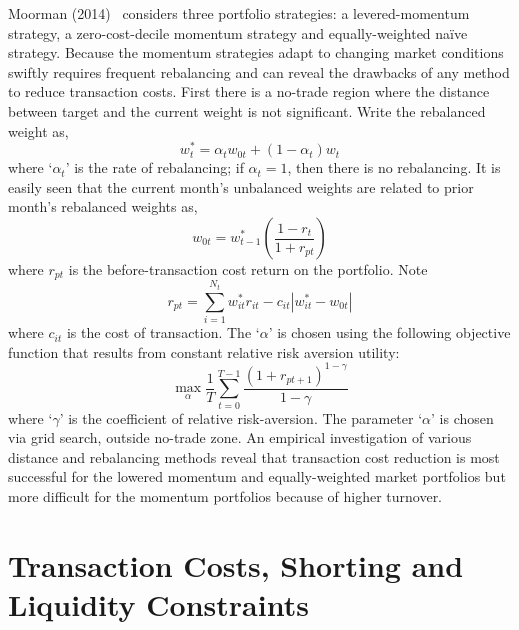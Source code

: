 Moorman (2014)~\cite{moorman} considers three portfolio strategies: a levered-momentum strategy, a zero-cost-decile momentum strategy and equally-weighted na\"ive strategy. Because the momentum strategies adapt to changing market conditions swiftly requires frequent rebalancing and can reveal the drawbacks of any method to reduce transaction costs. First there is a no-trade region where the distance between target and the current weight is not significant. Write the rebalanced weight as,
	\begin{equation}\label{eqn:rebalanceweight}
	w_t^*= \alpha_t w_{0t} + (1-\alpha_t)w_t
	\end{equation}
where `$\alpha_t$' is the rate of rebalancing; if $\alpha_t=1$, then there is no rebalancing. It is easily seen that the current month's unbalanced weights are related to prior month's rebalanced weights as,
	\begin{equation}\label{eqn:priorrebalanced}
	w_{0t}= w_{t-1}^* \left(\dfrac{1-r_t}{1+r_{pt}}\right)
	\end{equation}
where $r_{pt}$ is the before-transaction cost return on the portfolio. Note
	\begin{equation}\label{eqn:transnote}
	r_{pt}= \sum_{i=1}^{N_t} w_{it}^* r_{it} - c_{it} |w_{it}^* - w_{0t}|
	\end{equation}
where $c_{it}$ is the cost of transaction. The `$\alpha$' is chosen using the following objective function that results from constant relative risk aversion utility:
	\begin{equation}\label{eqn:objectivefun}
	\max_\alpha \dfrac{1}{T} \sum_{t=0}^{T-1} \dfrac{(1+r_{pt+1})^{1-\gamma}}{1-\gamma}
	\end{equation}
where `$\gamma$' is the coefficient of relative risk-aversion. The parameter `$\alpha$' is chosen via grid search, outside no-trade zone. An empirical investigation of various distance and rebalancing methods reveal that transaction cost reduction is most successful for the lowered momentum and equally-weighted market portfolios but more difficult for the momentum portfolios because of higher turnover. 



\section{Transaction Costs, Shorting and Liquidity Constraints}


